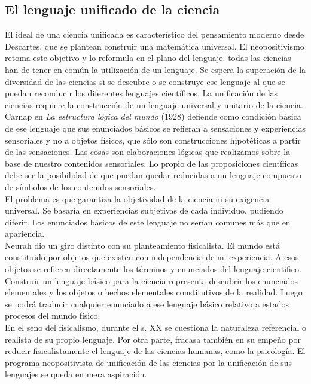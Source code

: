 \documentclass[a4paper, 11pt, twocolumn, spanish]{article}
\begin{document}
\subsection{El lenguaje unificado de la ciencia}
\label{sec:orge5f4469}
El ideal de una ciencia unificada es característico del pensamiento
moderno desde Descartes, que se plantean construir una matemática
universal. El neopositivismo retoma este objetivo y lo reformula en el
plano del lenguaje. todas las ciencias han de tener en común la
utilización de un lenguaje. Se espera la superación de la diversidad
de las ciencias si se descubre o se construye ese lenguaje al que se
puedan reconducir los diferentes lenguajes científicos. La unificación
de las ciencias requiere la construcción de un lenguaje universal y
unitario de la ciencia.\\[0pt]

Carnap en \emph{La estructura lógica del mundo} (1928) defiende como
condición básica de ese lenguaje que sus enunciados básicos se
refieran a sensaciones y experiencias sensoriales y no a objetos
físicos, que sólo son construcciones hipotéticas a partir de las
sensaciones. Las cosas son elaboraciones lógicas que realizamos sobre
la base de nuestro contenidos sensoriales. Lo propio de las
proposiciones científicas debe ser la posibilidad de que puedan quedar
reducidas a un lenguaje compuesto de símbolos de los contenidos
sensoriales.\\[0pt]

El problema es que garantiza la objetividad de la ciencia ni su
exigencia universal. Se basaría en experiencias subjetivas de cada
individuo, pudiendo diferir. Los enunciados básicos de este lenguaje
no serían comunes más que en apariencia.\\[0pt]
Neurah dio un giro distinto con su planteamiento fisicalista. El mundo
está constituido por objetos que existen con independencia de mi
experiencia. A esos objetos se refieren directamente los términos y
enunciados del lenguaje científico. Construir un lenguaje básico para
la ciencia representa descubrir los enunciados elementales y los
objetos o hechos elementales constitutivos de la realidad. Luego se
podrá traducir cualquier enunciado a ese lenguaje básico relativo a
estados  procesos del mundo físico.\\[0pt]

En el seno del fisicalismo, durante el s. XX se cuestiona la
naturaleza referencial o realista de su propio lenguaje. Por otra
parte, fracasa también en su empeño por reducir fisicalistamente el
lenguaje de las ciencias humanas, como la psicología. El programa
neopositivista de unificación de las ciencias por la unificación de
sus lenguajes se queda en mera aspiración.
\end{document}
